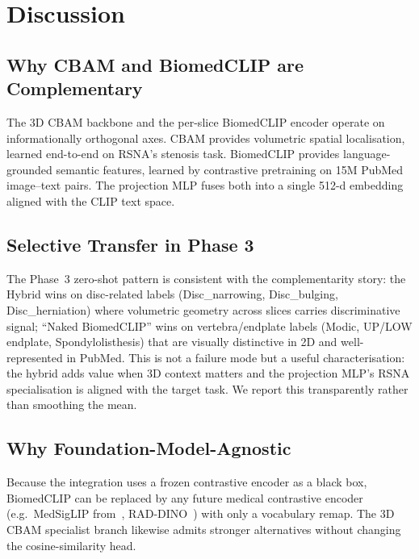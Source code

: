 \section{Discussion}
\label{sec:discussion}

\subsection{Why CBAM and BiomedCLIP are Complementary}
The 3D CBAM backbone and the per-slice BiomedCLIP encoder operate on
informationally orthogonal axes. CBAM provides volumetric spatial
localisation, learned end-to-end on RSNA's stenosis task. BiomedCLIP
provides language-grounded semantic features, learned by contrastive
pretraining on 15M PubMed image–text pairs. The projection MLP fuses
both into a single 512-d embedding aligned with the CLIP text space.

\subsection{Selective Transfer in Phase 3}
The Phase~3 zero-shot pattern is consistent with the complementarity
story: the Hybrid wins on disc-related labels (Disc\_narrowing,
Disc\_bulging, Disc\_herniation) where volumetric geometry across
slices carries discriminative signal; ``Naked BiomedCLIP'' wins on
vertebra/endplate labels (Modic, UP/LOW endplate, Spondylolisthesis)
that are visually distinctive in 2D and well-represented in PubMed.
This is not a failure mode but a useful characterisation: the hybrid
adds value when 3D context matters and the projection MLP's RSNA
specialisation is aligned with the target task. We report this
transparently rather than smoothing the mean.

\subsection{Why Foundation-Model-Agnostic}
Because the integration uses a frozen contrastive encoder as a black
box, BiomedCLIP can be replaced by any future medical contrastive
encoder (e.g.\ MedSigLIP from~\cite{sebro2025medgemma},
RAD-DINO~\cite{perezgarcia2024raddino}) with only a vocabulary remap.
The 3D CBAM specialist branch likewise admits stronger alternatives
without changing the cosine-similarity head.

